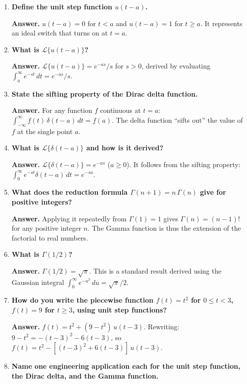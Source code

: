 \documentclass[12pt,a4paper]{article}
\begin{document}
\begin{enumerate}

\item \textbf{Define the unit step function $u(t-a)$.}

\textbf{Answer.} $u(t-a) = 0$ for $t < a$ and $u(t-a) = 1$ for $t \geq a$.
It represents an ideal switch that turns on at $t = a$.

\item \textbf{What is $\mathcal{L}\{u(t-a)\}$?}

\textbf{Answer.} $\mathcal{L}\{u(t-a)\} = e^{-as}/s$ for $s > 0$, derived
by evaluating $\int_a^{\infty} e^{-st}\,dt = e^{-as}/s$.

\item \textbf{State the sifting property of the Dirac delta function.}

\textbf{Answer.} For any function $f$ continuous at $t = a$:
$\int_{-\infty}^{\infty} f(t)\,\delta(t-a)\,dt = f(a)$.
The delta function ``sifts out'' the value of $f$ at the single point $a$.

\item \textbf{What is $\mathcal{L}\{\delta(t-a)\}$ and how is it derived?}

\textbf{Answer.} $\mathcal{L}\{\delta(t-a)\} = e^{-as}$ ($a \geq 0$).
It follows from the sifting property: $\int_0^{\infty} e^{-st}\delta(t-a)\,dt
= e^{-sa}$.

\item \textbf{What does the reduction formula $\Gamma(n+1) = n\,\Gamma(n)$
give for positive integers?}

\textbf{Answer.} Applying it repeatedly from $\Gamma(1) = 1$ gives
$\Gamma(n) = (n-1)!$ for any positive integer $n$. The Gamma function is thus
the extension of the factorial to real numbers.

\item \textbf{What is $\Gamma(1/2)$?}

\textbf{Answer.} $\Gamma(1/2) = \sqrt{\pi}$. This is a standard result derived
using the Gaussian integral $\int_0^{\infty} e^{-u^2}\,du = \sqrt{\pi}/2$.

\item \textbf{How do you write the piecewise function
$f(t) = t^2$ for $0 \leq t < 3$, $f(t) = 9$ for $t \geq 3$,
using unit step functions?}

\textbf{Answer.}
$f(t) = t^2 + (9 - t^2)\,u(t-3)$.
Rewriting: $9 - t^2 = -(t-3)^2 - 6(t-3)$, so
$f(t) = t^2 - [(t-3)^2 + 6(t-3)]\,u(t-3)$.

\item \textbf{Name one engineering application each for the unit step function,
the Dirac delta, and the Gamma function.}


\end{enumerate}
\end{document}
